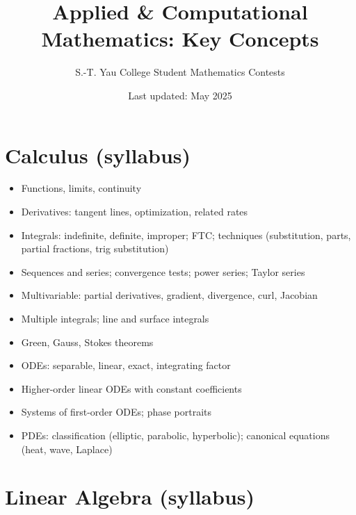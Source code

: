 \documentclass{amsart}
\title{Applied \& Computational Mathematics: Key Concepts}
\author{S.-T. Yau College Student Mathematics Contests}
\date{Last updated: May 2025}
\begin{document}
\maketitle

\section{Calculus (syllabus)}

\begin{itemize}
  \item Functions, limits, continuity
  \item Derivatives: tangent lines, optimization, related rates
  \item Integrals: indefinite, definite, improper; FTC; techniques (substitution, parts, partial fractions, trig substitution)
  \item Sequences and series; convergence tests; power series; Taylor series
  \item Multivariable: partial derivatives, gradient, divergence, curl, Jacobian
  \item Multiple integrals; line and surface integrals
  \item Green, Gauss, Stokes theorems
  \item ODEs: separable, linear, exact, integrating factor
  \item Higher-order linear ODEs with constant coefficients
  \item Systems of first-order ODEs; phase portraits
  \item PDEs: classification (elliptic, parabolic, hyperbolic); canonical equations (heat, wave, Laplace)
\end{itemize}

\section{Linear Algebra (syllabus)}
\end{document}
